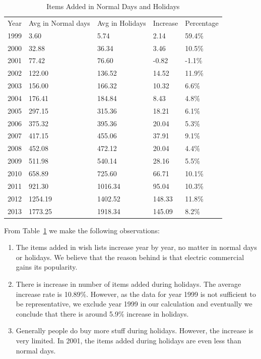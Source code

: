 \begin{table}[!htbp]
\centering
\caption{Items Added in Normal Days and Holidays}
\label{tb:year}
\begin{adjustbox}{max width=.5\textwidth}
\begin{tabular}{lllll}
Year & Avg in Normal days & Avg in Holidays & Increase & Percentage \\
1999 & 3.60 & 5.74 & 2.14 & 59.4\% \\
2000 & 32.88 & 36.34 & 3.46 & 10.5\% \\
2001 & 77.42 & 76.60 & -0.82 & -1.1\% \\
2002 & 122.00 & 136.52 & 14.52 & 11.9\% \\
2003 & 156.00 & 166.32 & 10.32 & 6.6\% \\
2004 & 176.41 & 184.84 & 8.43 & 4.8\% \\
2005 & 297.15 & 315.36 & 18.21 & 6.1\% \\
2006 & 375.32 & 395.36 & 20.04 & 5.3\% \\
2007 & 417.15 & 455.06 & 37.91 & 9.1\% \\
2008 & 452.08 & 472.12 & 20.04 & 4.4\% \\
2009 & 511.98 & 540.14 & 28.16 & 5.5\% \\
2010 & 658.89 & 725.60 & 66.71 & 10.1\% \\
2011 & 921.30 & 1016.34 & 95.04 & 10.3\% \\
2012 & 1254.19 & 1402.52 & 148.33 & 11.8\% \\
2013 & 1773.25 & 1918.34 & 145.09 & 8.2\% \\
\end{tabular}
\end{adjustbox}
\end{table}

From Table~\ref{tb:year} we make the following observations:
\begin{enumerate}
\item The items added in wish lists increase year by year, no matter in normal days or holidays. We believe that the reason behind is that electric commercial gains its popularity.
\item There is increase in number of items added during holidays. The average increase rate is 10.89\%. However, as the data for year 1999 is not sufficient to be representative, we exclude year 1999 in our calculation and eventually we conclude that there is around 5.9\% increase in holidays. 
\item Generally people do buy more stuff during holidays. However, the increase is very limited. In 2001, the items added during holidays are even less than normal days. 
\end{enumerate}

